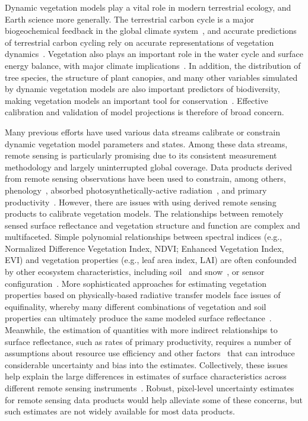 \introduction  %

Dynamic vegetation models play a vital role in modern terrestrial ecology, and Earth science more generally.
The terrestrial carbon cycle is a major biogeochemical feedback in the global climate system~\citep{heinze_2019_esd_reviews}, and accurate predictions of terrestrial carbon cycling rely on accurate representations of vegetation dynamics~\citep{pacala_1995_details_that_matter}.
Vegetation also plays an important role in the water cycle and surface energy balance, with major climate implications~\citep{bonan2008forests}.
In addition, the distribution of tree species, the structure of plant canopies, and many other variables simulated by dynamic vegetation models are also important predictors of biodiversity, making vegetation models an important tool for conservation~\citep{mcmahon2011improving}.
Effective calibration and validation of model projections is therefore of broad concern.

Many previous efforts have used various data streams calibrate or constrain dynamic vegetation model parameters and states.
Among these data streams, remote sensing is particularly promising due to its consistent measurement methodology and largely uninterrupted global coverage.
Data products derived from remote sensing observations have been used to constrain, among others,
phenology~\citep{knorr2010carbon, viskari2015modeldata},
absorbed photosynthetically-active radiation~\citep{peylin2016new, schurmann2016constraining},
and primary productivity~\citep{macbean2018strong}.
However, there are issues with using derived remote sensing products to calibrate vegetation models.
The relationships between remotely sensed surface reflectance and vegetation structure and function are complex and multifaceted.
Simple polynomial relationships between spectral indices (e.g., Normalized Difference Vegetation Index, NDVI; Enhanced Vegetation Index, EVI) and vegetation properties (e.g., leaf area index, LAI) are often confounded by other ecosystem characteristics, including soil~\citep{myneni1994relationship} and snow~\citep{zhang2020evaluating}, or sensor configuration~\citep{fensholt2004evaluation}.
More sophisticated approaches for estimating vegetation properties based on physically-based radiative transfer models face issues of equifinality, whereby many different combinations of vegetation and soil properties can ultimately produce the same modeled surface reflectance~\citep{combal2003retrieval, lewis2007spectral}.
Meanwhile, the estimation of quantities with more indirect relationships to surface reflectance, such as rates of primary productivity, requires a number of assumptions about resource use efficiency and other factors~\citep{running2004continuous} that can introduce considerable uncertainty and bias into the estimates.
Collectively, these issues help explain the large differences in estimates of surface characteristics across different remote sensing instruments~\citep{liu_2018_satellite}.
Robust, pixel-level uncertainty estimates for remote sensing data products would help alleviate some of these concerns, but such estimates are not widely available for most data products.

